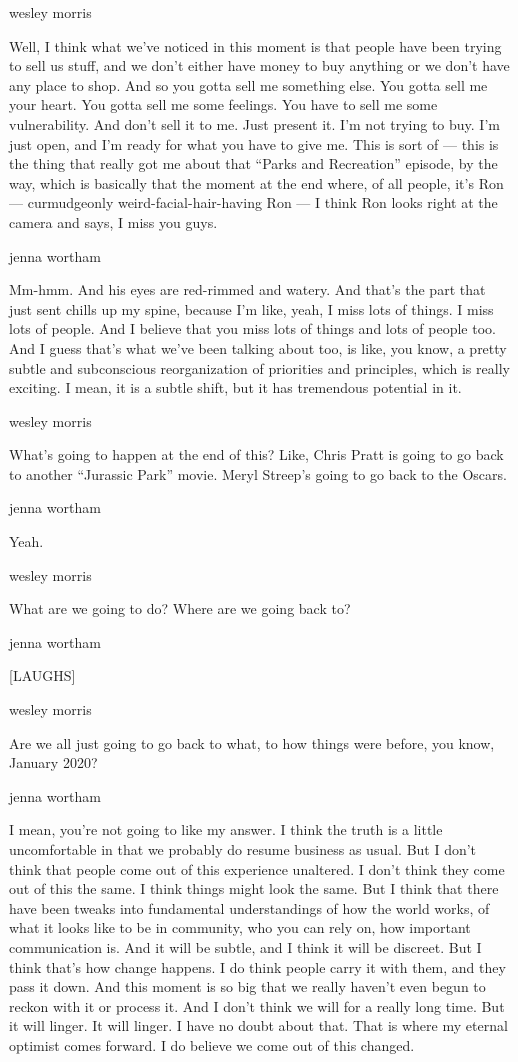 wesley morris

Well, I think what we've noticed in this moment is that people have been
trying to sell us stuff, and we don't either have money to buy anything
or we don't have any place to shop. And so you gotta sell me something
else. You gotta sell me your heart. You gotta sell me some feelings. You
have to sell me some vulnerability. And don't sell it to me. Just
present it. I'm not trying to buy. I'm just open, and I'm ready for what
you have to give me. This is sort of --- this is the thing that really
got me about that ``Parks and Recreation'' episode, by the way, which is
basically that the moment at the end where, of all people, it's Ron ---
curmudgeonly weird-facial-hair-having Ron --- I think Ron looks right at
the camera and says, I miss you guys.

jenna wortham

Mm-hmm. And his eyes are red-rimmed and watery. And that's the part that
just sent chills up my spine, because I'm like, yeah, I miss lots of
things. I miss lots of people. And I believe that you miss lots of
things and lots of people too. And I guess that's what we've been
talking about too, is like, you know, a pretty subtle and subconscious
reorganization of priorities and principles, which is really exciting. I
mean, it is a subtle shift, but it has tremendous potential in it.

wesley morris

What's going to happen at the end of this? Like, Chris Pratt is going to
go back to another ``Jurassic Park'' movie. Meryl Streep's going to go
back to the Oscars.

jenna wortham

Yeah.

wesley morris

What are we going to do? Where are we going back to?

jenna wortham

{[}LAUGHS{]}

wesley morris

Are we all just going to go back to what, to how things were before, you
know, January 2020?

jenna wortham

I mean, you're not going to like my answer. I think the truth is a
little uncomfortable in that we probably do resume business as usual.
But I don't think that people come out of this experience unaltered. I
don't think they come out of this the same. I think things might look
the same. But I think that there have been tweaks into fundamental
understandings of how the world works, of what it looks like to be in
community, who you can rely on, how important communication is. And it
will be subtle, and I think it will be discreet. But I think that's how
change happens. I do think people carry it with them, and they pass it
down. And this moment is so big that we really haven't even begun to
reckon with it or process it. And I don't think we will for a really
long time. But it will linger. It will linger. I have no doubt about
that. That is where my eternal optimist comes forward. I do believe we
come out of this changed.


